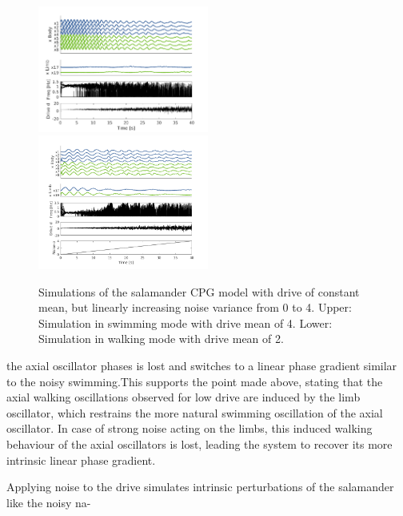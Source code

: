 \documentclass[a4paper]{scrartcl}
\begin{document}
{\begin{figure}[!h]
    	\includegraphics[width=0.5\textwidth]{fig/figure7b_drive-increasing-gaussian-swim.png}
	\includegraphics[width=0.5\textwidth]{fig/figure7b_drive-increasing-gaussian-walk.png}
	\caption{Simulations of the salamander CPG model with drive of constant mean, but linearly increasing noise variance from 0 to 4. Upper: Simulation in swimming mode with drive mean of 4. Lower: Simulation in walking mode with drive mean of 2.}
	\label{fig:7b-drive}
\end{figure}

{\setlength{\parindent}{0 cm}
the axial oscillator phases is lost and switches to a linear phase gradient similar to the noisy swimming.This supports the point made above, stating that the axial walking oscillations observed for low drive are induced by the limb oscillator, which restrains the more natural swimming oscillation of the axial oscillator. In case of strong noise acting on the limbs, this induced walking behaviour of the axial oscillators is lost, leading the system to recover its more intrinsic linear phase gradient.
}

Applying noise to the drive simulates intrinsic perturbations of the salamander like the noisy na-

}
\end{document}
